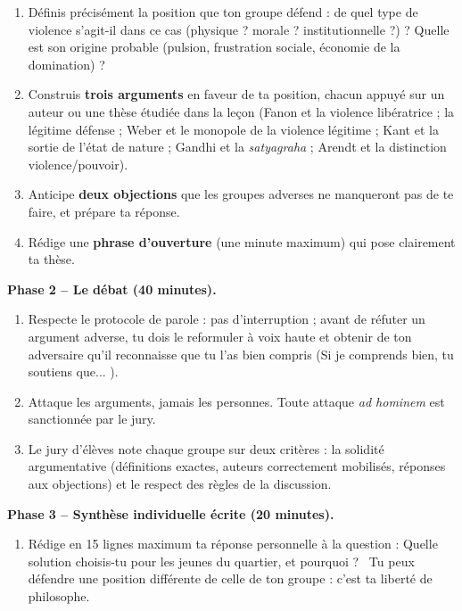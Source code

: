 \documentclass[11pt]{article}
\newcommand{\cle}[1]{{\popxbold\color{popdark}#1}}
\begin{document}
\begin{enumerate}
\item Définis précisément la position que ton groupe défend : de quel type de violence s'agit-il dans ce cas (physique ? morale ? institutionnelle ?) ? Quelle est son origine probable (pulsion, frustration sociale, économie de la domination) ?
\item Construis \textbf{trois arguments} en faveur de ta position, chacun appuyé sur un auteur ou une thèse étudiée dans la leçon (Fanon et la violence libératrice ; la légitime défense ; Weber et le monopole de la violence légitime ; Kant et la sortie de l'état de nature ; Gandhi et la \emph{satyagraha} ; Arendt et la distinction violence/pouvoir).
\item Anticipe \textbf{deux objections} que les groupes adverses ne manqueront pas de te faire, et prépare ta réponse.
\item Rédige une \textbf{phrase d'ouverture} (une minute maximum) qui pose clairement ta thèse.
\end{enumerate}

\textbf{Phase 2 -- Le débat (40 minutes).}

\begin{enumerate}
\item[5.] Respecte le protocole de parole : pas d'interruption ; avant de réfuter un argument adverse, tu dois le \cle{reformuler} à voix haute et obtenir de ton adversaire qu'il reconnaisse que tu l'as bien compris (\guillemotleft Si je comprends bien, tu soutiens que... \guillemotright).
\item[6.] Attaque les arguments, jamais les personnes. Toute attaque \emph{ad hominem} est sanctionnée par le jury.
\item[7.] Le jury d'élèves note chaque groupe sur deux critères : la \cle{solidité argumentative} (définitions exactes, auteurs correctement mobilisés, réponses aux objections) et le \cle{respect des règles} de la discussion.
\end{enumerate}

\textbf{Phase 3 -- Synthèse individuelle écrite (20 minutes).}

\begin{enumerate}
\item[8.] Rédige en 15 lignes maximum ta réponse personnelle à la question : \guillemotleft Quelle solution choisis-tu pour les jeunes du quartier, et pourquoi ? \guillemotright\ Tu peux défendre une position différente de celle de ton groupe : c'est ta liberté de philosophe.
\end{enumerate}
\end{document}
